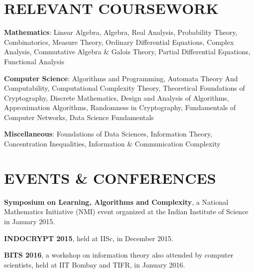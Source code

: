 \documentclass[margin]{res}
\begin{document}
\begin{resume}
 




\section{RELEVANT COURSEWORK}
\par
\textbf{Mathematics}:
Linear Algebra, Algebra, Real Analysis, Probability Theory, Combinatorics, Measure Theory, Ordinary Differential Equations, Complex Analysis, Commutative Algebra \& Galois Theory, Partial Differential Equations, Functional Analysis

\par
\textbf{Computer Science}:
Algorithms and Programming, Automata Theory And Computability, Computational Complexity Theory, Theoretical Foundations of Cryptography, Discrete Mathematics, Design and Analysis of Algorithms, Approximation Algorithms, Randomness in Cryptography, Fundamentals of Computer Networks, Data Science Fundamentals

\par
\textbf{Miscellaneous}:
Foundations of Data Sciences, Information Theory, Concentration Inequalities, Information \& Communication Complexity



\iffalse

\section{EVENTS \& CONFERENCES}

\textbf{Symposium on Learning, Algorithms and Complexity}, a National Mathematics Initiative (NMI) event organized at the Indian Institute of Science in January 2015.
\par

\textbf{INDOCRYPT 2015},  held at IISc, in December 2015.

\textbf{BITS 2016}, a workshop on information theory also attended by computer scientists, held at IIT Bombay and TIFR, in January 2016.


\end{resume}
\end{document}
